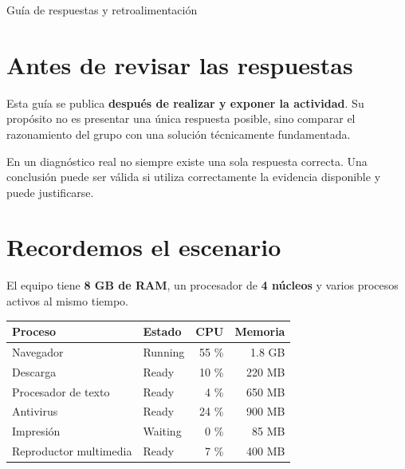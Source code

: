 \documentclass[
  spanish,
  letterpaper,
]{scrbook}
\newcounter{none} %
\begin{document}
Guía de respuestas y retroalimentación

\hfill\break


\chapter{Antes de revisar las
respuestas}\label{antes-de-revisar-las-respuestas}

Esta guía se publica \textbf{después de realizar y exponer la
actividad}. Su propósito no es presentar una única respuesta posible,
sino comparar el razonamiento del grupo con una solución técnicamente
fundamentada.

\begin{tcolorbox}[enhanced jigsaw, arc=.35mm, bottomrule=.15mm, bottomtitle=1mm, breakable, colback=white, colbacktitle=quarto-callout-important-color!10!white, colframe=quarto-callout-important-color-frame, coltitle=black, left=2mm, leftrule=.75mm, opacityback=0, opacitybacktitle=0.6, rightrule=.15mm, title=\textcolor{quarto-callout-important-color}{\faExclamation}\hspace{0.5em}{Una idea importante}, titlerule=0mm, toprule=.15mm, toptitle=1mm]

En un diagnóstico real no siempre existe una sola respuesta correcta.
Una conclusión puede ser válida si utiliza correctamente la evidencia
disponible y puede justificarse.

\end{tcolorbox}


\chapter{Recordemos el escenario}\label{recordemos-el-escenario}

El equipo tiene \textbf{8 GB de RAM}, un procesador de \textbf{4
núcleos} y varios procesos activos al mismo tiempo.

{\def\LTcaptype{none} %
\begin{longtable}[]{@{}llrr@{}}
\toprule\noalign{}
Proceso & Estado & CPU & Memoria \\
\midrule\noalign{}
\endhead
\bottomrule\noalign{}
\endlastfoot
Navegador & Running & 55 \% & 1.8 GB \\
Descarga & Ready & 10 \% & 220 MB \\
Procesador de texto & Ready & 4 \% & 650 MB \\
Antivirus & Ready & 24 \% & 900 MB \\
Impresión & Waiting & 0 \% & 85 MB \\
Reproductor multimedia & Ready & 7 \% & 400 MB \\
\end{longtable}
}
\end{document}
